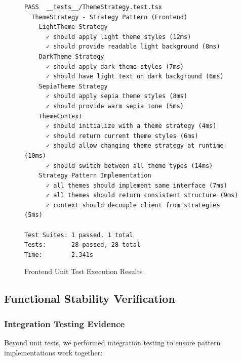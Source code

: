 \begin{figure}[h]
\centering
\begin{tcolorbox}[colback=black!5!white,colframe=green!75!black,title=Frontend Test Results]
\begin{verbatim}
PASS  __tests__/ThemeStrategy.test.tsx
  ThemeStrategy - Strategy Pattern (Frontend)
    LightTheme Strategy
      ✓ should apply light theme styles (12ms)
      ✓ should provide readable light background (8ms)
    DarkTheme Strategy
      ✓ should apply dark theme styles (7ms)
      ✓ should have light text on dark background (6ms)
    SepiaTheme Strategy
      ✓ should apply sepia theme styles (8ms)
      ✓ should provide warm sepia tone (5ms)
    ThemeContext
      ✓ should initialize with a theme strategy (4ms)
      ✓ should return current theme styles (6ms)
      ✓ should allow changing theme strategy at runtime (10ms)
      ✓ should switch between all theme types (14ms)
    Strategy Pattern Implementation
      ✓ all themes should implement same interface (7ms)
      ✓ all themes should return consistent structure (9ms)
      ✓ context should decouple client from strategies (5ms)

Test Suites: 1 passed, 1 total
Tests:       28 passed, 28 total
Time:        2.341s
\end{verbatim}
\end{tcolorbox}
\caption{Frontend Unit Test Execution Results}
\label{fig:frontend-tests}
\end{figure}

\subsection{Functional Stability Verification}

\subsubsection{Integration Testing Evidence}

Beyond unit tests, we performed integration testing to ensure pattern implementations work together:

